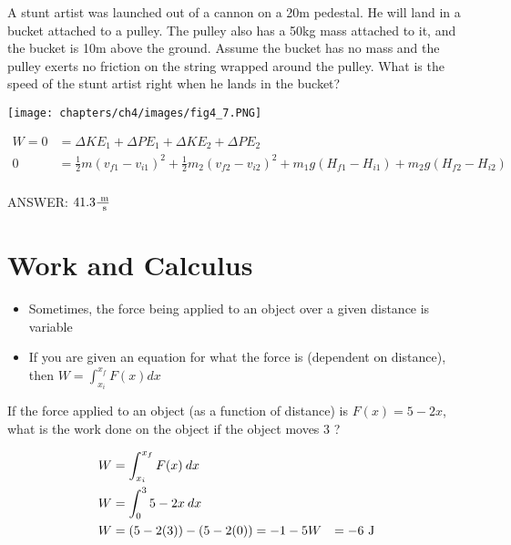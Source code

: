 \begin{problem}
    A stunt artist was launched out of a cannon on a 20m pedestal. He will land in a bucket attached to a pulley. The pulley also has a 50kg mass attached to it, and the bucket is 10m above the ground. Assume the bucket has no mass and the pulley exerts no friction on the string wrapped around the pulley. What is the speed of the stunt artist right when he lands in the bucket? 
    
    \begin{center}
        \texttt{[image: chapters/ch4/images/fig4\_7.PNG]}
    \end{center}

    $$
    \begin{aligned}
        W = 0 &= \Delta KE_1 + \Delta PE_1 + \Delta KE_2 + \Delta PE_2\\
        0 &= \frac{1}{2}m(v_{f1}-v_{i1})^2 + \frac{1}{2}m_2(v_{f2}-v_{i2})^2 + m_1g(H_{f1} - H_{i1}) + m_2g(H_{f2} - H_{i2})\\
    \end{aligned}
    $$

    ANSWER: $41.3 \frac{\text{ m}}{\text{ s}}$
\end{problem}


\section{Work and Calculus}

\begin{itemize}
    \item Sometimes, the force being applied to an object over a given distance is variable
    \item If you are given an equation for what the force is (dependent on distance), then $W = \int_{x_i}^{x_f} F(x) dx$
\end{itemize}


\begin{problem}
    If the force applied to an object (as a function of distance) is $F(x) = 5 - 2x$, what is the work done on the object if the object moves 3 \m?

    $$
    \begin{aligned}
        W &= \int_{x_i}^{x_f} F(x) \: dx\\
        W &= \int_{0}^{3} 5-2x \: dx\\
        W &= (5-2(3))-(5-2(0)) = -1-5
        W &= -6 \text{ J}
    \end{aligned}
    $$
\end{problem}


